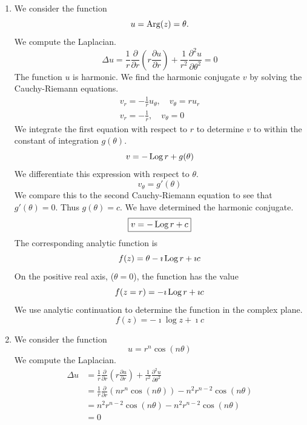 {\begin{Solution}
\begin{enumerate}
    \[
    f(z = r) = r \Log r + \imath c.
    \]
    We use analytic continuation to determine the function in the 
    complex plane.
    \[
    \boxed{
      f(z) = z \log z + \imath c
      }
    \]
  \item
    We consider the function
    \[
    u = \mathop{\mathrm{Arg}}\nolimits(z) = \theta.
    \]
    We compute the Laplacian.
    \[
    \Delta u = \frac{1}{r} \frac{\partial}{\partial r} \left( r \frac{\partial u}{\partial r} \right)
    + \frac{1}{r^2} \frac{\partial^2 u}{\partial \theta^2} = 0
    \]
    The function $u$ is harmonic.  We find the harmonic conjugate $v$ by 
    solving the Cauchy-Riemann equations.
    \begin{gather*}
      v_r = - \frac{1}{r} u_\theta, \quad v_\theta = r u_r 
      \\
      v_r = - \frac{1}{r}, \quad
      v_\theta = 0 
    \end{gather*}
    We integrate the first equation with respect to $r$ to determine $v$ to 
    within the constant of integration $g(\theta)$.
    \[
    v = - \mathop{\mathrm{Log}}\nolimits r + g(\theta)
    \]
    We differentiate this expression with respect to $\theta$.
    \[
    v_\theta = g'(\theta)
    \]
    We compare this to the second Cauchy-Riemann equation to see that
    $g'(\theta) = 0$.  Thus $g(\theta) = c$.  We have determined the harmonic conjugate.
    \[
    \boxed{
      v = - \mathop{\mathrm{Log}}\nolimits r + c
      }
    \]
    The corresponding analytic function is 
    \[
    f(z) = \theta - \imath \mathop{\mathrm{Log}}\nolimits r + \imath c
    \]
    On the positive real axis, ($\theta = 0$), the function has the value
    \[
    f(z = r) = - \imath \mathop{\mathrm{Log}}\nolimits r + \imath c
    \]
    We use analytic continuation to determine the function in the 
    complex plane.
    \[
    \boxed{
      f(z) = - \imath \log z + \imath c
      }
    \]
  \item
    We consider the function
    \[
    u = r^n \cos(n \theta)
    \]
    We compute the Laplacian.
    \begin{align*}
      \Delta u &= \frac{1}{r} \frac{\partial}{\partial r} \left( r \frac{\partial u}{\partial r} \right)
      + \frac{1}{r^2} \frac{\partial^2 u}{\partial \theta^2} 
      \\
      &= \frac{1}{r} \frac{\partial}{\partial r} \left( n r^n \cos(n \theta) \right)
      - n^2 r^{n-2} \cos(n \theta) 
      \\
      &= n^2 r^{n-2} \cos(n \theta) - n^2 r^{n-2} \cos(n \theta) 
      \\
      &= 0
    \end{align*}

\end{enumerate}
\end{Solution}}
